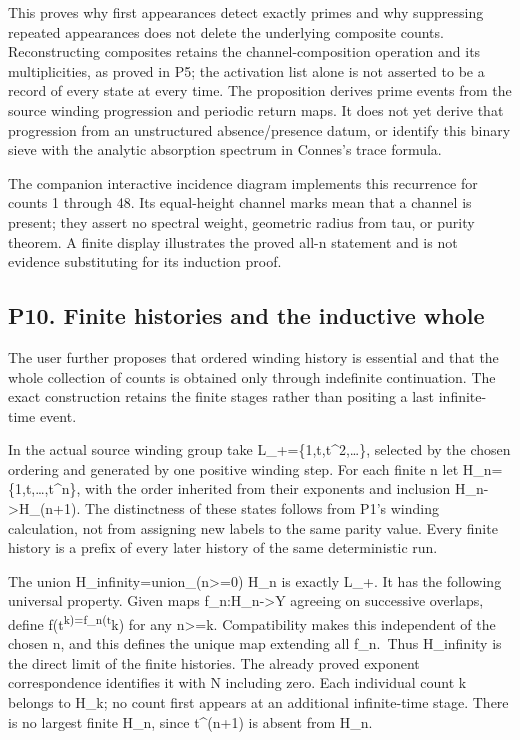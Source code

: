 \documentclass[
  11pt,
]{article}
\begin{document}
This proves why first appearances detect exactly primes and why
suppressing repeated appearances does not delete the underlying
composite counts. Reconstructing composites retains the
channel-composition operation and its multiplicities, as proved in P5;
the activation list alone is not asserted to be a record of every state
at every time. The proposition derives prime events from the source
winding progression and periodic return maps. It does not yet derive
that progression from an unstructured absence/presence datum, or
identify this binary sieve with the analytic absorption spectrum in
Connes's trace formula.

The companion interactive incidence diagram implements this recurrence
for counts 1 through 48. Its equal-height channel marks mean that a
channel is present; they assert no spectral weight, geometric radius
from tau, or purity theorem. A finite display illustrates the proved
all-n statement and is not evidence substituting for its induction
proof.

\subsection{P10. Finite histories and the inductive
whole}\label{p10.-finite-histories-and-the-inductive-whole}

The user further proposes that ordered winding history is essential and
that the whole collection of counts is obtained only through indefinite
continuation. The exact construction retains the finite stages rather
than positing a last infinite-time event.

In the actual source winding group take L\_+=\{1,t,t\^{}2,\ldots\},
selected by the chosen ordering and generated by one positive winding
step. For each finite n let H\_n=\{1,t,\ldots,t\^{}n\}, with the order
inherited from their exponents and inclusion H\_n-\textgreater H\_(n+1).
The distinctness of these states follows from P1's winding calculation,
not from assigning new labels to the same parity value. Every finite
history is a prefix of every later history of the same deterministic
run.

The union H\_infinity=union\_(n\textgreater=0) H\_n is exactly L\_+. It
has the following universal property. Given maps
f\_n:H\_n-\textgreater Y agreeing on successive overlaps, define
f(t\textsuperscript{k)=f\_n(t}k) for any n\textgreater=k. Compatibility
makes this independent of the chosen n, and this defines the unique map
extending all f\_n.~Thus H\_infinity is the direct limit of the finite
histories. The already proved exponent correspondence identifies it with
N including zero. Each individual count k belongs to H\_k; no count
first appears at an additional infinite-time stage. There is no largest
finite H\_n, since t\^{}(n+1) is absent from H\_n.
\end{document}
